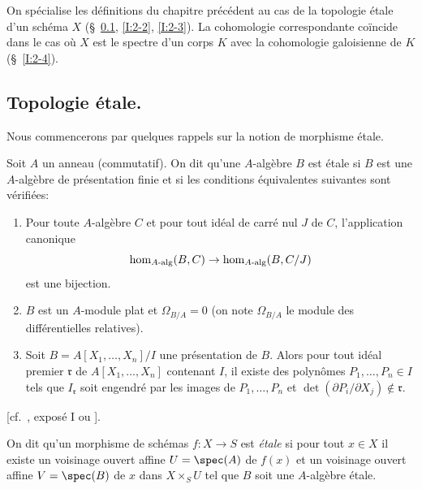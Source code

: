 On spécialise les définitions du chapitre précédent au cas de la 
topologie étale d'un schéma $X$ (\S~\ref{I:2-1}, \ref{I:2-2}, \ref{I:2-3}). La 
cohomologie correspondante coïncide dans le cas où $X$ est le spectre d'un 
corps $K$ avec la cohomologie galoisienne de $K$ (\S~\ref{I:2-4}). 










\subsection{Topologie étale.}\label{I:2-1}

Nous commencerons par quelques rappels sur la notion de morphisme étale. 

\begin{definitiondash}\label{I:2-1-1}
Soit $A$ un anneau (commutatif). On dit qu'une $A$-algèbre $B$ est étale si 
$B$ est une $A$-algèbre de présentation finie et si les conditions 
équivalentes suivantes sont vérifiées:
\begin{enumerate}[\indent a)]
  \item Pour toute $A$-algèbre $C$ et pour tout idéal de carré nul $J$ de 
    $C$, l'application canonique 
    \[
      \hom_{A\textnormal{-alg}}(B,C) \to \hom_{A\textnormal{-alg}}(B,C/J)
    \]
    est une bijection.
  \item $B$ est un $A$-module plat et $\Omega_{B/A}=0$ (on note $\Omega_{B/A}$ 
    le module des différentielles relatives).
  \item Soit $B=A[X_1,\dotsc,X_n]/I$ une présentation de $B$. Alors pour tout 
    idéal premier $\mathfrak{r}$ de $A[X_1,\dotsc,X_n]$ contenant $I$, il existe des 
    polynômes $P_1,\dotsc,P_n\in I$ tels que $I_{\mathfrak{r}}$ soit engendré par les 
    images de $P_1,\dotsc,P_n$ et $\det(\partial P_i/\partial X_j)\notin \mathfrak{r}$.  
\end{enumerate}
\end{definitiondash}
[cf.\ , exposé I ou
].

On dit qu'un morphisme de schémas $f:X\to S$ est \emph{étale} si pour tout 
$x\in X$ il existe un voisinage ouvert affine $U=\spec(A)$ de $f(x)$ et un 
voisinage ouvert affine $V=\spec(B)$ de $x$ dans $X\times_S U$ tel que $B$ soit 
une $A$-algèbre étale. 





